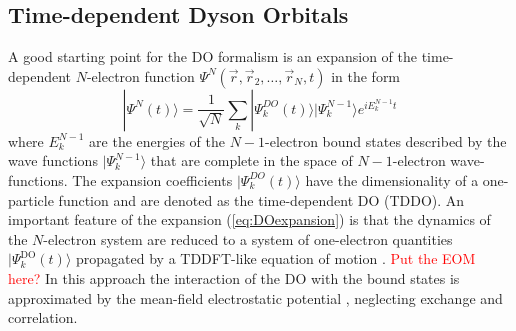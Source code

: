 {\subsection{Time-dependent Dyson Orbitals}
A good starting point for the DO formalism is an expansion of the time-dependent $N$-electron function $\Psi^N(\vec{r}, \vec{r}_2, \hdots,\vec{r}_N, t)$ in the form
\begin{equation} \label{eq:DOexpansion}
| \Psi^N (t)\rangle =\frac{1}{\sqrt{N}} \sum_k |\Psi_k^{DO}(t)\rangle | \Psi^{N-1}_k \rangle e^{iE_k^{N-1}t}
\end{equation}
where $E_k^{N-1}$ are the energies of the $N-1$-electron bound states described by the wave functions $|\Psi_k^{N-1}\rangle$ that are complete in the space of $N-1$-electron wave-functions.
The expansion coefficients $|\Psi_k^{DO}(t)\rangle$ have the dimensionality of a one-particle function and are denoted as the time-dependent DO (TDDO).
An important feature of the expansion (\ref{eq:DOexpansion}) is that the dynamics of the $N$-electron system are reduced to a system of one-electron quantities $|\Psi_k^\text{DO}(t)\rangle$ propagated by a TDDFT-like equation of motion \cite{TD-do}.
\textcolor{red}{Put the EOM here?}
In this approach the interaction of the DO with the bound states is approximated by the mean-field electrostatic potential \cite{TD-do}, neglecting exchange and correlation.

}
